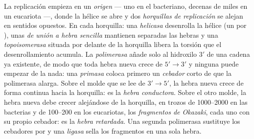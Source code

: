 \begin{definition}\label{def:b1:replication-mitosis:fork}
La replicación empieza en un \emph{origen} --- uno en el 
bacteriano, decenas de miles en un  eucariota ---, donde la hélice se
abre y dos \emph{horquillas de replicación} se alejan en sentidos opuestos.
En cada horquilla: una \emph{helicasa} desenrolla la hélice (un  por ), unas \emph{ de unión a hebra sencilla} mantienen
separadas las hebras y una \emph{topoisomerasa} situada por delante de la
horquilla libera la torsión que el desenrollamiento acumula. La \emph{
polimerasa} añade  solo al hidroxilo $3'$ de una cadena ya
existente, de modo que toda hebra nueva crece de $5' \to 3'$ y ninguna puede
empezar de la nada: una \emph{primasa} coloca primero un \emph{cebador}
corto de  que la polimerasa alarga. Sobre el molde que se lee de
$3' \to 5'$, la hebra nueva crece de forma continua hacia la horquilla: es
la \emph{hebra conductora}. Sobre el otro molde, la hebra nueva debe crecer
alejándose de la horquilla, en trozos de \qtyrange{1000}{2000}{} 
en las bacterias y de \qtyrange{100}{200}{} en los eucariotas, los
\emph{fragmentos de Okazaki}, cada uno con su propio cebador: es la
\emph{hebra retardada}. Una segunda polimerasa sustituye los cebadores por
 y una \emph{ligasa} sella los fragmentos en una sola hebra.
\end{definition}

